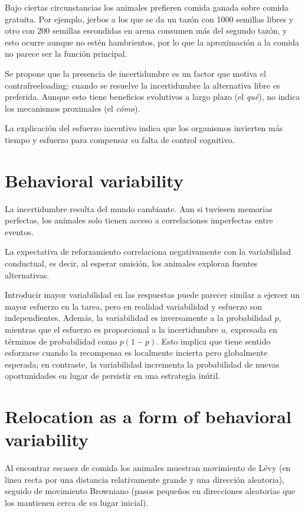 \documentclass[a4paper,12pt]{article}
\begin{document}
Bajo ciertas circunstancias los animales prefieren comida ganada sobre comida gratuita.
Por ejemplo, jerbos a los que se da un tazón con 1000 semillas libres y otro con 200 semillas escondidas en arena consumen más del segundo tazón, y esto ocurre aunque no estén hambrientos, por lo que la aproximación a la comida no parece ser la función principal.

Se propone que la presencia de incertidumbre es un factor que motiva el contrafreeloading: cuando se resuelve la incertidumbre la alternativa libre es preferida.
Aunque esto tiene beneficios evolutivos a largo plazo (el {\itshape qué}), no indica los mecanismos proximales (el {\itshape cómo}).

La explicación del esfuerzo incentivo indica que los organismos invierten más tiempo y esfuerzo para compensar su falta de control cognitivo.

\section{Behavioral variability}

La incertidumbre resulta del mundo cambiante.
Aun si tuviesen memorias perfectas, los animales solo tienen acceso a correlaciones imperfectas entre eventos.

La expectativa de reforzamiento correlaciona negativamente con la variabilidad conductual, es decir, al esperar omisión, los animales exploran fuentes alternativas.

Introducir mayor variabilidad en las respuestas puede parecer similar a ejercer un mayor esfuerzo en la tarea, pero en realidad variabilidad y esfuerzo son independientes.
Además, la variabilidad es inversamente a la probabilidad $p$, mientras que el esfuerzo es proporcional a la incertidumbre $u$, expresada en términos de probabilidad como $p(1-p)$.
Esto implica que tiene sentido esforzarse cuando la recompensa es localmente incierta pero globalmente esperada; en contraste, la variabilidad incrementa la probabilidad de nuevas oportunidades en lugar de persistir en una estrategia inútil.

\section{Relocation as a form of behavioral variability}

Al encontrar escasez de comida los animales muestran movimiento de Lévy (en linea recta por una distancia relativamente grande y una dirección aleatoria), seguido de movimiento Browniano (pasos pequeños en direcciones aleatorias que los mantienen cerca de su lugar inicial).
\end{document}
